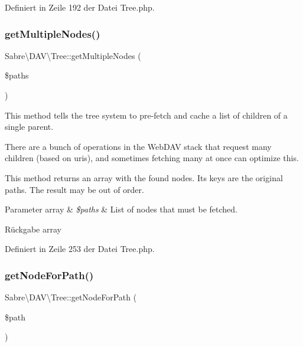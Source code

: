 Definiert in Zeile 192 der Datei Tree.\+php.

\mbox{\label{class_sabre_1_1_d_a_v_1_1_tree_a416b65f3262503d1f3ac549331719d0c}} 
\subsubsection{\texorpdfstring{get\+Multiple\+Nodes()}{getMultipleNodes()}}
{\footnotesize\ttfamily Sabre\textbackslash{}\+D\+A\+V\textbackslash{}\+Tree\+::get\+Multiple\+Nodes (\begin{DoxyParamCaption}\item[{}]{\$paths }\end{DoxyParamCaption})}

This method tells the tree system to pre-\/fetch and cache a list of children of a single parent.

There are a bunch of operations in the Web\+D\+AV stack that request many children (based on uris), and sometimes fetching many at once can optimize this.

This method returns an array with the found nodes. It\textquotesingle{}s keys are the original paths. The result may be out of order.


\begin{DoxyParams}[1]{Parameter}
array & {\em \$paths} & List of nodes that must be fetched. \\
\hline
\end{DoxyParams}
\begin{DoxyReturn}{Rückgabe}
array 
\end{DoxyReturn}


Definiert in Zeile 253 der Datei Tree.\+php.

\mbox{\label{class_sabre_1_1_d_a_v_1_1_tree_a55b3f7a65673158036984f3f110c532f}} 
\subsubsection{\texorpdfstring{get\+Node\+For\+Path()}{getNodeForPath()}}
{\footnotesize\ttfamily Sabre\textbackslash{}\+D\+A\+V\textbackslash{}\+Tree\+::get\+Node\+For\+Path (\begin{DoxyParamCaption}\item[{}]{\$path }\end{DoxyParamCaption})}

